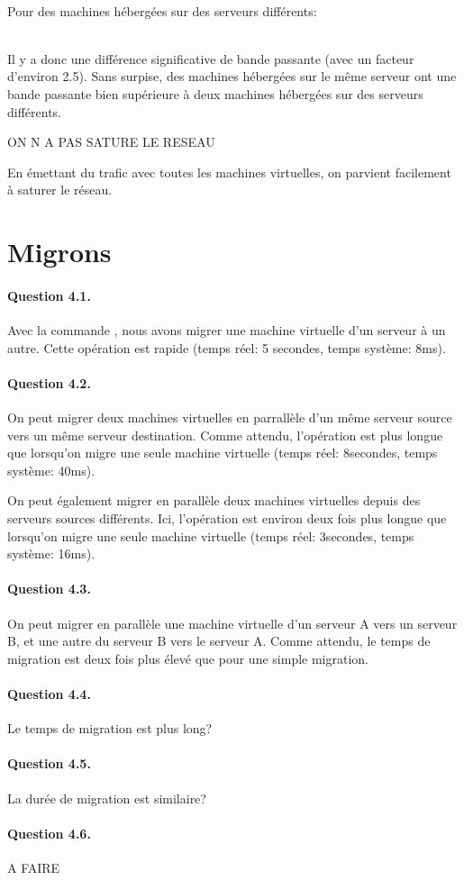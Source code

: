 \documentclass[12pt]{article}
\begin{document}
\\

Pour des machines hébergées sur des serveurs différents:

\\

Il y a donc une différence significative de bande passante (avec un facteur d'environ 2.5). Sans surpise, des machines hébergées sur le même serveur ont une bande passante bien supérieure à deux machines hébergées sur des serveurs différents.

ON N A PAS SATURE LE RESEAU

En émettant du trafic avec toutes les machines virtuelles, on parvient facilement à saturer le réseau.

\section{Migrons}
\paragraph{Question 4.1.}

Avec la commande , nous avons migrer une machine virtuelle d'un serveur à un autre. Cette opération est rapide (temps réel: 5 secondes, temps système: 8ms).

\paragraph{Question 4.2.}

On peut migrer deux machines virtuelles en parrallèle d'un même serveur source vers un même serveur destination. Comme attendu, l'opération est plus longue que lorsqu'on migre une seule machine virtuelle (temps réel: 8secondes, temps système: 40ms).


On peut également migrer en parallèle deux machines virtuelles depuis des serveurs sources différents. Ici, l'opération est environ deux fois plus longue que lorsqu'on migre une seule machine virtuelle (temps réel: 3secondes, temps système: 16ms).



\paragraph{Question 4.3.}

On peut migrer en parallèle une machine virtuelle d'un serveur A vers un serveur B, et une autre du serveur B vers le serveur A. Comme attendu, le temps de migration est deux fois plus élevé que pour une simple migration.

\paragraph{Question 4.4.}

Le temps de migration est plus long?

\paragraph{Question 4.5.}

La durée de migration est similaire?

\paragraph{Question 4.6.}

A FAIRE
\end{document}
